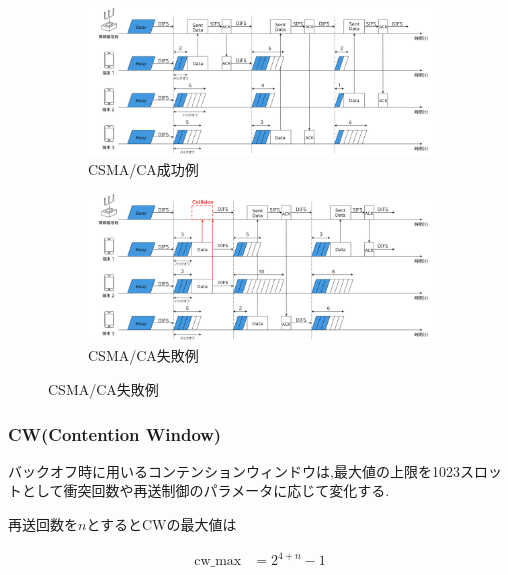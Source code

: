 \documentclass[a4paper, 10pt]{ltjsarticle}
\begin{document}
\begin{figure}[H]
  \centering

  \begin{subfigure}{\columnwidth}
    \centering
    \includegraphics[width=1\columnwidth]{./assets/csma-ca-s.png}
    \caption{CSMA/CA成功例}
  \end{subfigure}


  \begin{subfigure}{\columnwidth}
    \centering
    \includegraphics[width=1\columnwidth]{./assets/csma-ca-f.png}
    \caption{CSMA/CA失敗例}
  \end{subfigure}
  \label{CSMA/CA}
\end{figure}

\subsubsection{CW(Contention Window)}

バックオフ時に用いるコンテンションウィンドウは,最大値の上限を1023スロットとして衝突回数や再送制御のパラメータに応じて変化する.

再送回数を$n$とするとCWの最大値は



\begin{align}
  \text{cw\_max} &= 2^{4 + n} - 1
\end{align}
\end{document}
